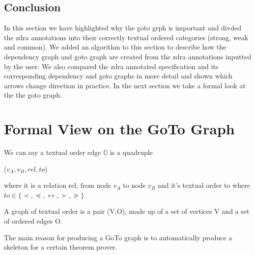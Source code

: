 \subsection{Conclusion}

In this section we have highlighted why the goto grph is important and divded
the \gls{zdra} annotations into their correctly textual ordered categories
(strong, weak and common). We added an algorithm to this section to describe how
the dependency graph and goto graph are created from the \gls{zdra} annotations
inputted by the user. We also compared the \gls{zdra} annotated specification
and its corresponding dependency and goto graphs in more detail and shown which
arrows change direction in practice. In the next section we take a formal look
at the the goto graph.

\section{Formal View on the GoTo Graph}

\begin{defin} We can say a textual order edge $\mathbb{O}$
is a quadruple
\begin{center}
($v_{A}, v_{B}, rel, to$)
\end{center}
where it is a relation rel, from node $v_{A}$ to node $v_{B}$ and it's textual
order to where $to \in \{\prec , \preceq , \leftrightarrow , \succ , \succeq
\}$.
\end{defin}

\begin{defin} A graph of textual order is a pair (V,O),
made up of a set of vertices V and a set of ordered edges O.
\end{defin}

The main reason for producing a GoTo graph is to automatically produce a
skeleton for a certain theorem prover.

